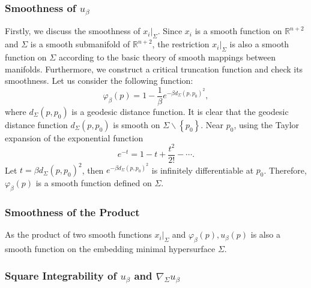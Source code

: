 \documentclass[a4, 12pt]{amsart}
\numberwithin{equation}{section} \numberwithin{equation}{section}
\begin{document}
\subsubsection{Smoothness of $u_{\beta}$}

Firstly, we discuss the smoothness of $\left.x_{i}\right|_{\Sigma}$. Since $x_{i}$ is a smooth function on $\mathbb{R}^{n+2}$ and $\Sigma$ is a smooth submanifold of $\mathbb{R}^{n+2}$, the restriction $\left.x_{i} \right| _{\Sigma}$ is also a smooth function on $\Sigma$ according to the basic theory of smooth mappings between manifolds.
Furthermore, we construct a critical truncation function and check its smoothness. Let us consider the following function:
\begin{equation*}\varphi_{\beta}(p)=1-\frac{1}{\beta} e^{-\beta d_{\Sigma}\left(p, p_{0}\right)^{2}},\end{equation*} where $d_{\Sigma}\left(p, p_{0}\right)$ is a geodesic distance function. It is clear that the geodesic distance function $d_{\Sigma}\left(p, p_{0}\right)$ is smooth on $\Sigma \backslash\left\{p_{0}\right\}$. Near $p_{0}$, using the Taylor expansion of the exponential function
\begin{equation*}e^{-t}=1-t+\frac{t^{2}}{2!}-\cdots.\end{equation*} Let $t=\beta d_{\Sigma}\left(p, p_{0}\right)^{2}$, then $e^{-\beta d_{\Sigma}\left(p, p_{0}\right)^{2}}$ is infinitely differentiable at $p_{0}$. Therefore, $\varphi_{\beta}(p)$ is a smooth function defined on $\Sigma$.
\subsubsection{Smoothness of the Product} As the product of two smooth functions $\left.x_{i}\right|_{\Sigma}$ and $\varphi_{\beta}(p), u_{\beta}(p)$ is also a smooth function on the embedding minimal hypersurface $\Sigma$.

\subsubsection{Square Integrability of $u_{\beta}$ and $\nabla_{\Sigma} u_{\beta}$}
\end{document}
